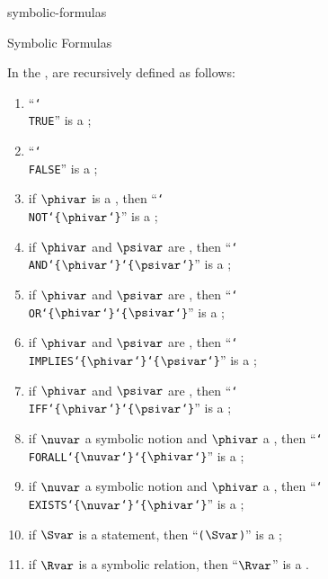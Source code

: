\documentclass{stex}
\begin{document}
\begin{smodule}{symbolic-formulas}
\begin{sfragment}[id=sec:symbolic-formulas]{Symbolic Formulas}
\begin{sparagraph}[style=symdoc]
    In the \stexdialect,  are recursively defined as follows:
    \begin{enumerate}
      \item ``\texttt{\char`\\TRUE}'' is a ;
      \item ``\texttt{\char`\\FALSE}'' is a ;
      \item if $\phivar$ is a ,
        then ``\texttt{\char`\\NOT\char`\{}$\phivar$\texttt{\char`\}}'' is a ;
      \item if $\phivar$ and $\psivar$ are ,
        then ``\texttt{\char`\\AND\char`\{}$\phivar$\texttt{\char`\}\char`\{}$\psivar$\texttt{\char`\}}'' is a ;
      \item if $\phivar$ and $\psivar$ are ,
        then ``\texttt{\char`\\OR\char`\{}$\phivar$\texttt{\char`\}\char`\{}$\psivar$\texttt{\char`\}}'' is a ;
      \item if $\phivar$ and $\psivar$ are ,
        then ``\texttt{\char`\\IMPLIES\char`\{}$\phivar$\texttt{\char`\}\char`\{}$\psivar$\texttt{\char`\}}'' is a ;
      \item if $\phivar$ and $\psivar$ are ,
        then ``\texttt{\char`\\IFF\char`\{}$\phivar$\texttt{\char`\}\char`\{}$\psivar$\texttt{\char`\}}'' is a ;
      \item if $\nuvar$ a symbolic notion and $\phivar$ a ,
        then ``\texttt{\char`\\FORALL\char`\{}$\nuvar$\texttt{\char`\}\char`\{}$\phivar$\texttt{\char`\}}'' is a ;
      \item if $\nuvar$ a symbolic notion and $\phivar$ a ,
        then ``\texttt{\char`\\EXISTS\char`\{}$\nuvar$\texttt{\char`\}\char`\{}$\phivar$\texttt{\char`\}}'' is a ;
      \item if $\Svar$ is a statement,
        then ``\texttt($\Svar$\texttt)'' is a ;
      \item if $\Rvar$ is a symbolic relation,
        then ``$\Rvar$'' is a .
    \end{enumerate}


\end{sparagraph}
\end{sfragment}
\end{smodule}
\end{document}
